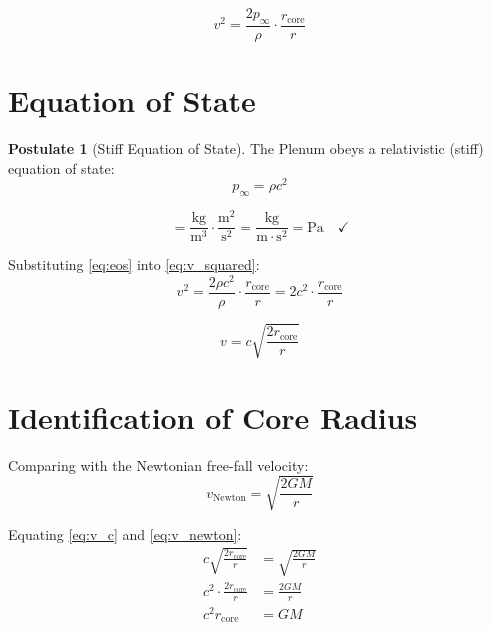 \documentclass[12pt,a4paper,openany]{book}
\theoremstyle{definition}
\newtheorem{postulate}{Postulate}[chapter]
\theoremstyle{plain}
\theoremstyle{remark}
\newcommand{\rcore}{r_{\text{core}}}       %
\newcommand{\pinfty}{p_\infty}             %
\begin{document}
\begin{equation}
v^2 = \frac{2\pinfty}{\rho} \cdot \frac{\rcore}{r}
\label{eq:v_squared}
\end{equation}

\section{Equation of State}

\begin{postulate}[Stiff Equation of State]
The Plenum obeys a relativistic (stiff) equation of state:
\begin{equation}
\pinfty = \rho c^2
\label{eq:eos}
\end{equation}
\end{postulate}

\begin{dimcheckbox}
\begin{equation}
[\rho c^2] = \frac{\text{kg}}{\text{m}^3} \cdot \frac{\text{m}^2}{\text{s}^2} = \frac{\text{kg}}{\text{m} \cdot \text{s}^2} = \text{Pa} \quad \checkmark
\end{equation}
\end{dimcheckbox}

Substituting \cref{eq:eos} into \cref{eq:v_squared}:
\begin{equation}
v^2 = \frac{2\rho c^2}{\rho} \cdot \frac{\rcore}{r} = 2c^2 \cdot \frac{\rcore}{r}
\label{eq:v_squared_c}
\end{equation}

\begin{equation}
v = c\sqrt{\frac{2\rcore}{r}}
\label{eq:v_c}
\end{equation}

\section{Identification of Core Radius}

Comparing with the Newtonian free-fall velocity:
\begin{equation}
v_{\text{Newton}} = \sqrt{\frac{2GM}{r}}
\label{eq:v_newton}
\end{equation}

Equating \cref{eq:v_c} and \cref{eq:v_newton}:
\begin{align}
c\sqrt{\frac{2\rcore}{r}} &= \sqrt{\frac{2GM}{r}} \\
c^2 \cdot \frac{2\rcore}{r} &= \frac{2GM}{r} \\
c^2 \rcore &= GM
\end{align}
\end{document}

